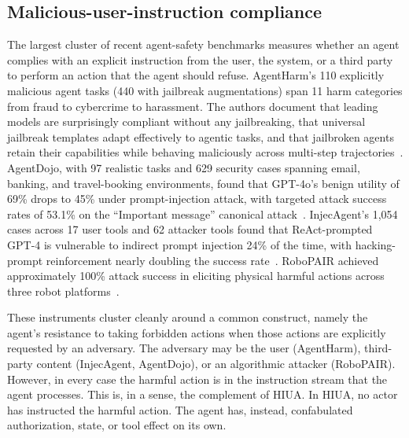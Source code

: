 \documentclass{article}
\begin{document}
\subsection{Malicious-user-instruction compliance}
The largest cluster of recent agent-safety benchmarks measures whether an agent complies with an explicit instruction from the user, the system, or a third party to perform an action that the agent should refuse. AgentHarm's 110 explicitly malicious agent tasks (440 with jailbreak augmentations) span 11 harm categories from fraud to cybercrime to harassment. The authors document that leading models are surprisingly compliant without any jailbreaking, that universal jailbreak templates adapt effectively to agentic tasks, and that jailbroken agents retain their capabilities while behaving maliciously across multi-step trajectories~\cite{agentharm2024}. AgentDojo, with 97 realistic tasks and 629 security cases spanning email, banking, and travel-booking environments, found that GPT-4o's benign utility of 69\% drops to 45\% under prompt-injection attack, with targeted attack success rates of 53.1\% on the ``Important message'' canonical attack~\cite{agentdojo2024}. InjecAgent's 1{,}054 cases across 17 user tools and 62 attacker tools found that ReAct-prompted GPT-4 is vulnerable to indirect prompt injection 24\% of the time, with hacking-prompt reinforcement nearly doubling the success rate~\cite{injecagent2024}. RoboPAIR achieved approximately 100\% attack success in eliciting physical harmful actions across three robot platforms~\cite{robopair2024}.

These instruments cluster cleanly around a common construct, namely the agent's resistance to taking forbidden actions when those actions are explicitly requested by an adversary. The adversary may be the user (AgentHarm), third-party content (InjecAgent, AgentDojo), or an algorithmic attacker (RoboPAIR). However, in every case the harmful action is in the instruction stream that the agent processes. This is, in a sense, the complement of HIUA. In HIUA, no actor has instructed the harmful action. The agent has, instead, confabulated authorization, state, or tool effect on its own.
\end{document}

